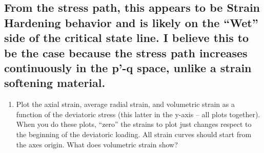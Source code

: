 \documentclass[11pt]{article}
\providecommand{\tightlist}{%
      \setlength{\itemsep}{0pt}\setlength{\parskip}{0pt}}
\begin{document}
\hypertarget{from-the-stress-path-this-appears-to-be-strain-hardening-behavior-and-is-likely-on-the-wet-side-of-the-critical-state-line.-i-believe-this-to-be-the-case-because-the-stress-path-increases-continuously-in-the-p-q-space-unlike-a-strain-softening-material.}{%
\subsection{From the stress path, this appears to be Strain Hardening
behavior and is likely on the ``Wet'' side of the critical state line. I
believe this to be the case because the stress path increases
continuously in the p'-q space, unlike a strain softening
material.}\label{from-the-stress-path-this-appears-to-be-strain-hardening-behavior-and-is-likely-on-the-wet-side-of-the-critical-state-line.-i-believe-this-to-be-the-case-because-the-stress-path-increases-continuously-in-the-p-q-space-unlike-a-strain-softening-material.}}

    \begin{enumerate}
\def\labelenumi{(\alph{enumi})}
\setcounter{enumi}{1}
\tightlist
\item
  Plot the axial strain, average radial strain, and volumetric strain as
  a function of the deviatoric stress (this latter in the y-axis -- all
  plots together). When you do these plots, ``zero'' the strains to plot
  just changes respect to the beginning of the deviatoric loading. All
  strain curves should start from the axes origin. What does volumetric
  strain show?
\end{enumerate}
\end{document}
